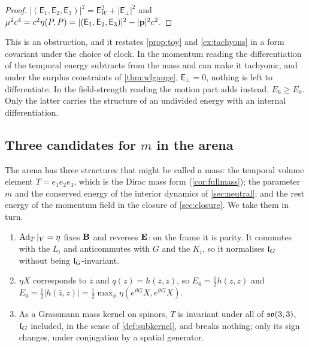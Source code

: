 \begin{proof}
$|(\mathsf E_1,\mathsf E_2,\mathsf E_3)|^2=\mathsf E_W^2+|\mathsf E_\perp|^2$ and $\mu^2c^4=c^2\eta(P,P)=|(\mathsf E_1,\mathsf E_2,\mathsf E_3)|^2-|\mathbf p|^2c^2$.
\end{proof}

This is an obstruction, and it restates \cref{prop:toy} and \cref{ex:tachyons} in a form covariant under the choice of clock. In the momentum
reading the differentiation of the temporal energy subtracts from the mass and can make it tachyonic, and under the surplus constraints of
\cref{thm:wlgauge}, $\mathsf E_\perp=0$, nothing is left to differentiate. In the field-strength reading the motion part adds instead,
$E_6\ge E_0$. Only the latter carries the structure of an undivided energy with an internal differentiation.

\subsection{\texorpdfstring{Three candidates for $m$ in the arena}{Three candidates for m in the arena}}
\label{sec:energy-candidates}

The arena has three structures that might be called a mass: the temporal volume element $T=e_1e_2e_3$, which is the Dirac mass form
(\cref{cor:fullmass}); the parameter $m$ and the conserved energy of the interior dynamics of \cref{sec:neutral}; and the rest energy of the
momentum field in the closure of \cref{sec:closure}. We take them in turn.

\begin{proposition}
\label{en:parity}
\begin{enumerate}[label=(\roman*),leftmargin=2.2em]
\item $\operatorname{Ad}_T|_V=\eta$ fixes $\mathbf B$ and reverses $\mathbf E$: on the frame it is parity. It commutes with the $L_i$ and anticommutes with $G$ and the
$K_i$, so it normalises $\mathfrak l_G$ without being $\mathfrak l_G$-invariant.
\item $\eta X$ corresponds to $\bar z$ and $q(z)=h(\bar z,z)$, so $E_6=\tfrac12h(z,z)$ and
$E_0=\tfrac12|h(\bar z,z)|=\tfrac12\max_\vartheta\eta(e^{\vartheta G}X,e^{\vartheta G}X)$.
\item As a Grassmann mass kernel on spinors, $T$ is invariant under all of $\mathfrak{so}(3,3)$, $\mathfrak l_G$ included, in the sense of \cref{def:subkernel}, and
breaks nothing; only its sign changes, under conjugation by a spatial generator.
\end{enumerate}
\end{proposition}

